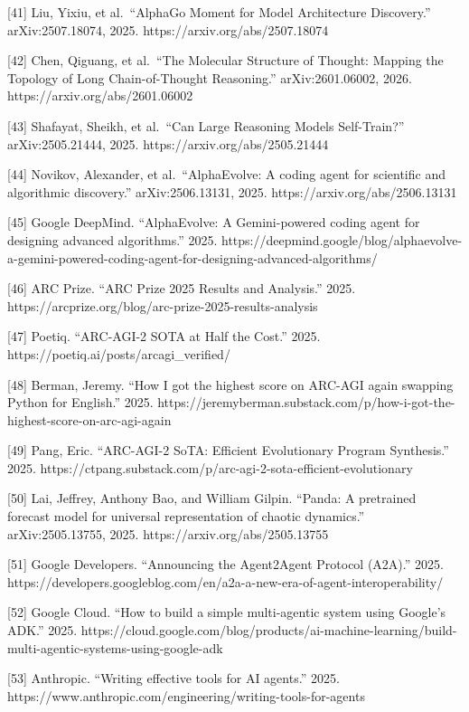 {[}41{]} Liu, Yixiu, et al.~``AlphaGo Moment for Model Architecture
Discovery.'' arXiv:2507.18074, 2025. https://arxiv.org/abs/2507.18074

{[}42{]} Chen, Qiguang, et al.~``The Molecular Structure of Thought:
Mapping the Topology of Long Chain-of-Thought Reasoning.''
arXiv:2601.06002, 2026. https://arxiv.org/abs/2601.06002

{[}43{]} Shafayat, Sheikh, et al.~``Can Large Reasoning Models
Self-Train?'' arXiv:2505.21444, 2025. https://arxiv.org/abs/2505.21444

{[}44{]} Novikov, Alexander, et al.~``AlphaEvolve: A coding agent for
scientific and algorithmic discovery.'' arXiv:2506.13131, 2025.
https://arxiv.org/abs/2506.13131

{[}45{]} Google DeepMind. ``AlphaEvolve: A Gemini-powered coding agent
for designing advanced algorithms.'' 2025.
https://deepmind.google/blog/alphaevolve-a-gemini-powered-coding-agent-for-designing-advanced-algorithms/

{[}46{]} ARC Prize. ``ARC Prize 2025 Results and Analysis.'' 2025.
https://arcprize.org/blog/arc-prize-2025-results-analysis

{[}47{]} Poetiq. ``ARC-AGI-2 SOTA at Half the Cost.'' 2025.
https://poetiq.ai/posts/arcagi\_verified/

{[}48{]} Berman, Jeremy. ``How I got the highest score on ARC-AGI again
swapping Python for English.'' 2025.
https://jeremyberman.substack.com/p/how-i-got-the-highest-score-on-arc-agi-again

{[}49{]} Pang, Eric. ``ARC-AGI-2 SoTA: Efficient Evolutionary Program
Synthesis.'' 2025.
https://ctpang.substack.com/p/arc-agi-2-sota-efficient-evolutionary

{[}50{]} Lai, Jeffrey, Anthony Bao, and William Gilpin. ``Panda: A
pretrained forecast model for universal representation of chaotic
dynamics.'' arXiv:2505.13755, 2025. https://arxiv.org/abs/2505.13755

{[}51{]} Google Developers. ``Announcing the Agent2Agent Protocol
(A2A).'' 2025.
https://developers.googleblog.com/en/a2a-a-new-era-of-agent-interoperability/

{[}52{]} Google Cloud. ``How to build a simple multi-agentic system
using Google's ADK.'' 2025.
https://cloud.google.com/blog/products/ai-machine-learning/build-multi-agentic-systems-using-google-adk

{[}53{]} Anthropic. ``Writing effective tools for AI agents.'' 2025.
https://www.anthropic.com/engineering/writing-tools-for-agents


